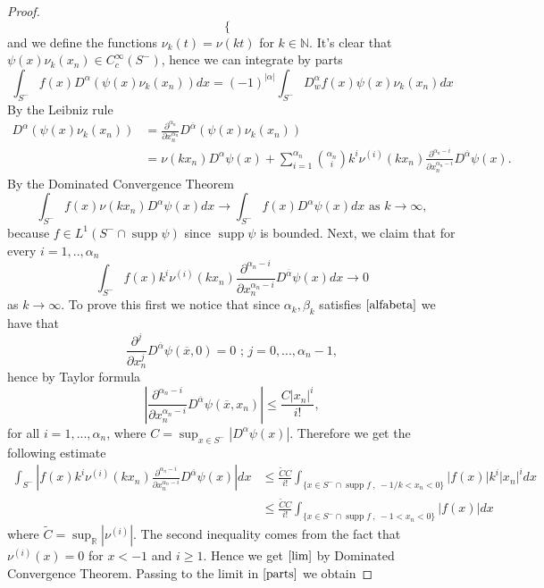 \documentclass[12pt]{article}
\theoremstyle{definition}
\DeclareMathOperator\supp{supp}
\begin{document}
\begin{proof}
\[\begin{cases}
\end{cases} 
\]
and we define the functions $\nu_k(t)=\nu(kt)$ for $k \in \mathbb{N}$. It's clear that $\psi(x) \nu_k(x_n) \in C^\infty_c(S^-)$, hence we can integrate by parts
\begin{equation}\label{parts}
\int_{S^-}  f(x)D^{\alpha}(\psi(x) \nu_k(x_n)) dx = (-1)^{|\alpha|}\int_{S^-} D^\alpha_w f(x)\psi(x) \nu_k(x_n) dx  
\end{equation}
By the Leibniz rule 
\begin{align*}
D^{\alpha}(\psi(x) \nu_k(x_n)) &=\frac{\partial^{\alpha_n}}{\partial x_n^{\alpha_n}} D^{\overline \alpha}(\psi(x) \nu_k(x_n)) \\
				        &= \nu(kx_n)D^{\alpha}\psi(x)+\sum_{i=1}^{\alpha_n}  {{\alpha_n}  \choose {i} }  k^i \nu^{(i)}(kx_n)\frac{\partial^{\alpha_n-i}}{\partial x_n^{\alpha_n-i}} D^{\overline \alpha}\psi(x).
\end{align*}
By the Dominated Convergence Theorem
\[ \int_{S^-} f(x) \nu(kx_n)D^{\alpha}\psi(x)dx  \rightarrow \int_{S^-} f(x) D^{\alpha}\psi(x)dx \text{    as } k\rightarrow \infty,\]
because $f \in L^1(S^- \cap \supp \psi)$ since $\supp \psi$ is bounded.
Next, we claim that for every $i=1,..,\alpha_n$
\begin{equation}\label{lim}
\int_{S^-}  f(x) k^i \nu^{(i)}(kx_n)\frac{\partial^{\alpha_n-i}}{\partial x_n^{\alpha_n-i}} D^{\overline \alpha}\psi(x)dx  \rightarrow 0 
\end{equation}
as $k \rightarrow \infty$. To prove this first we notice that since  $\alpha_k,\beta_k$ satisfies $\eqref{alfabeta}$ we have that 
\[   \frac{\partial^j}{\partial x_n^j} D^{\overline \alpha}\psi(\overline x, 0)=0 \text{  ;  }j=0,...,\alpha_n-1,\]
hence by Taylor formula 
\[  \left| \frac{\partial^{\alpha_n - i}}{\partial x_n^{\alpha_n - i}} D^{\overline \alpha}\psi(\overline x, x_n) \right|  \le \frac{C|x_n|^i}{i!},\]
for all $i=1,...,\alpha_n$, where $C= \sup_{x \in   S^-} |D^{\alpha} \psi(x)|$. Therefore we get the following estimate
\begin{align*}
   	\int_{S^-}  \left|  f(x) k^i \nu^{(i)}(kx_n)\frac{\partial^{\alpha_n-i}}{\partial x_n^{\alpha_n-i}} D^{\overline \alpha}\psi(x)     \right |  dx  &\le 
	 \frac{\widetilde CC}{i!} \int_{ \{ x \in S^-\cap \supp f \ , \ -1/k< x_n<0 \} }   |f(x)| k^i |x_n|^i  dx  \\
	& \le \frac{\widetilde CC}{i!}   \int_{ \{ x \in S^-\cap \supp f \ ,\  -1< x_n<0 \} }   |f(x)| dx 
\end{align*}
where $\widetilde C = \sup_\mathbb{R} |\nu^{(i)}|$. The second inequality comes from the fact that $\nu^{(i)}(x)=0$ for $x<-1$ and $i\ge 1$. Hence we get $\eqref{lim}$ by Dominated Convergence Theorem. Passing to the limit in $\eqref{parts}$ we obtain

\end{proof}
\end{document}

